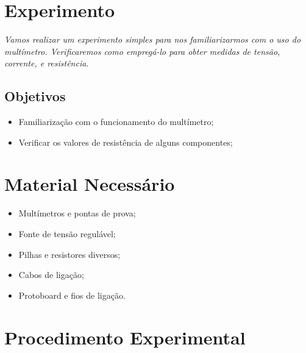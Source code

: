 \section{Experimento}

\emph{Vamos realizar um experimento simples para nos familiarizarmos com o uso do multímetro. Verificaremos como empregá-lo para obter medidas de tensão, corrente, e resistência.}

\subsection{Objetivos}

\begin{itemize}
	\item Familiarização com o funcionamento do multímetro;
	\item Verificar os valores de resistência de alguns componentes;
\end{itemize}

\section{Material Necessário}

\begin{itemize}
	\item Multímetros e pontas de prova;
	\item Fonte de tensão regulável;
	\item Pilhas e resistores diversos;
	\item Cabos de ligação;
	\item Protoboard e fios de ligação.
\end{itemize}

\section{Procedimento Experimental}

